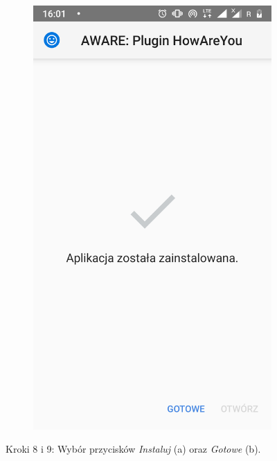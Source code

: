 \begin{enumerate}
\begin{figure}[H]
\begin{subfigure}{0.35\textwidth}
			\includegraphics[scale=0.13]{dodatekA/2_9.png}
			\subcaption{\label{subfigure_b}}
		\end{subfigure}
		\caption{ Kroki 8 i 9: Wybór przycisków \textit{Instaluj} (a) oraz \textit{Gotowe} (b).}
	\end{figure}
\end{enumerate}


